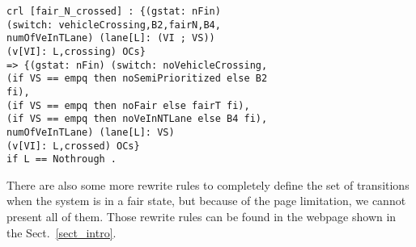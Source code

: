 \documentclass[10pt, conference, compsocconf]{IEEEtran}
\begin{document}
\begin{small}
	\begin{verbatim}
crl [fair_N_crossed] : {(gstat: nFin) 
(switch: vehicleCrossing,B2,fairN,B4,
numOfVeInTLane) (lane[L]: (VI ; VS)) 
(v[VI]: L,crossing) OCs} 
=> {(gstat: nFin) (switch: noVehicleCrossing,
(if VS == empq then noSemiPrioritized else B2 
fi), 
(if VS == empq then noFair else fairT fi), 
(if VS == empq then noVeInNTLane else B4 fi),
numOfVeInTLane) (lane[L]: VS) 
(v[VI]: L,crossed) OCs} 
if L == Nothrough .
\end{verbatim}
\end{small}

There are also some more rewrite rules to completely define the set of transitions when the system is in a fair state, but because of the page limitation, we cannot present all of them.
Those rewrite rules can be found in the webpage shown in the Sect.~\ref{sect_intro}.

%
%
%
%
\end{document}
